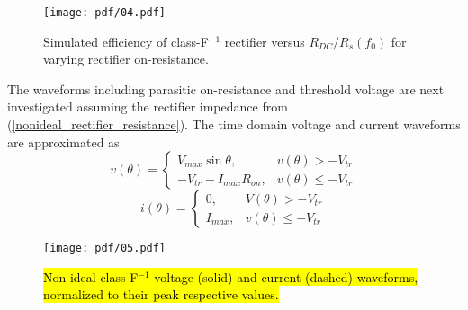 %

\begin{figure}[!b]
  \begin{center}
  \texttt{[image: pdf/04.pdf]}
  \caption{Simulated efficiency of class-F$^{-1}$ rectifier versus $R_{DC} / R_s(f_0)$ for varying rectifier on-resistance.}\label{sim_opt_eff_classFinv}
  \end{center}
\end{figure}

The waveforms including parasitic on-resistance and threshold voltage are next investigated assuming the rectifier impedance from (\ref{nonideal_rectifier_resistance}). The time domain voltage and current waveforms are approximated as
\begin{equation}\label{diode_voltage_waveform_finv_par}
v(\theta) =
\begin{cases}
    V_{max}\sin\theta, & v(\theta) > -V_{tr}\\
    -V_{tr} - I_{max}R_{on}, & v(\theta) \leq -V_{tr}
\end{cases}
\end{equation}
\begin{equation}\label{diode_current_waveform_finv_par}
i(\theta) =
\begin{cases}
    0, & V(\theta) > -V_{tr}\\
    I_{max}, & v(\theta) \leq -V_{tr}
\end{cases}
\end{equation}



\begin{figure}[!b]
  \begin{center}
  \texttt{[image: pdf/05.pdf]}
  \caption{\hl{Non-ideal class-F$^{-1}$ voltage (solid) and current (dashed) waveforms, normalized to their peak respective values.}}\label{finv_waveform_nonideal}
  \end{center}
\end{figure}

